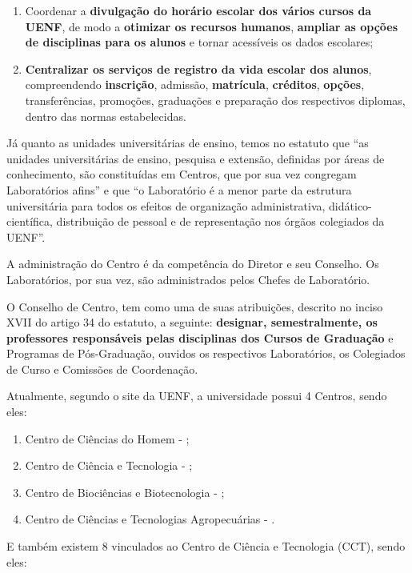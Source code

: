 \begin{enumerate}
  \item Coordenar a \textbf{divulgação do horário escolar dos vários cursos da UENF}, de modo a \textbf{otimizar os recursos humanos}, \textbf{ampliar as opções de disciplinas para os alunos} e tornar acessíveis os dados escolares;
  \item \textbf{Centralizar os serviços de registro da vida escolar dos alunos}, compreendendo \textbf{inscrição}, admissão, \textbf{matrícula}, \textbf{créditos}, \textbf{opções}, transferências, promoções, graduações e preparação dos respectivos diplomas, dentro das normas estabelecidas.
\end{enumerate}

Já quanto as unidades universitárias de ensino, temos no estatuto que ``as unidades universitárias de ensino, pesquisa e extensão, definidas por áreas de conhecimento, são constituídas em Centros, que por sua vez congregam Laboratórios afins'' e que ``o Laboratório é a menor parte da estrutura universitária para todos os efeitos de organização administrativa, didático-científica, distribuição de pessoal e de representação nos órgãos colegiados da UENF''.

A administração do Centro é da competência do Diretor e seu Conselho. Os Laboratórios, por sua vez, são administrados pelos Chefes de Laboratório.

O Conselho de Centro, tem como uma de suas atribuições, descrito no inciso XVII do artigo 34 do estatuto, a seguinte: \textbf{designar, semestralmente, os professores responsáveis pelas disciplinas dos Cursos de Graduação} e Programas de Pós-Graduação, ouvidos os respectivos Laboratórios, os Colegiados de Curso e Comissões de Coordenação.

Atualmente, segundo o site da UENF, a universidade possui 4 Centros, sendo eles:

\begin{enumerate}
  \item Centro de Ciências do Homem - ;
  \item Centro de Ciência e Tecnologia - ;
  \item Centro de Biociências e Biotecnologia - ;
  \item Centro de Ciências e Tecnologias Agropecuárias - .
\end{enumerate}

E também existem 8  vinculados ao Centro de Ciência e Tecnologia (CCT), sendo eles:

